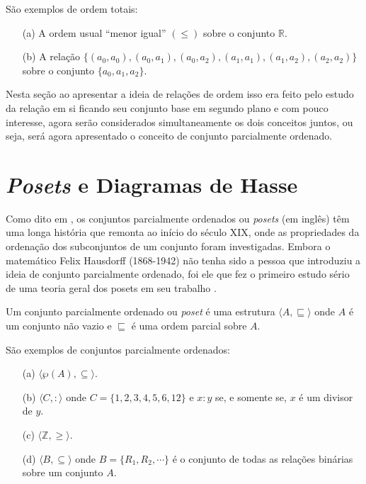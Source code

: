 \begin{exemplo}
	São exemplos de ordem totais:
	\begin{itemize}
		\item[(a)] A ordem usual ``menor igual'' $(\leq)$ sobre o conjunto $\mathbb{R}$.
		\item[(b)] A relação $\{(a_0, a_0), (a_0, a_1), (a_0, a_2), (a_1, a_1), (a_1, a_2), (a_2, a_2)\}$ sobre o conjunto $\{a_0, a_1, a_2\}$.
	\end{itemize}
\end{exemplo}

Nesta seção ao apresentar a ideia de relações de ordem isso era feito pelo estudo da relação em si ficando seu conjunto base em segundo plano e com pouco interesse, agora serão considerados simultaneamente os dois conceitos juntos, ou seja, será agora apresentado o conceito de conjunto parcialmente ordenado.

\section{\textit{Posets} e Diagramas de Hasse}\label{sec:Poset}

Como dito em \cite{neggers1998poset},  os conjuntos parcialmente ordenados ou \textit{posets} (em inglês) têm uma longa história que remonta ao início do século XIX, onde as propriedades da ordenação dos subconjuntos de um conjunto foram investigadas.  Embora o matemático Felix Hausdorff (1868-1942) não tenha sido a pessoa que introduziu a ideia de conjunto parcialmente ordenado, foi ele que fez o primeiro estudo sério de uma teoria geral dos posets em seu trabalho \cite{hausdorff1914poset}. 

\begin{definicao}[Poset]
	Um conjunto parcialmente ordenado ou \textit{poset} é uma estrutura $\langle A, \sqsubseteq \rangle$ onde $A$ é um conjunto não vazio e $\sqsubseteq$ é uma ordem parcial sobre $A$.
\end{definicao}

\begin{exemplo}
	São exemplos de conjuntos parcialmente ordenados:
	\begin{itemize}
		\item[(a)] $\langle \wp(A), \subseteq \rangle$.
		\item[(b)] $\langle C,  : \rangle$ onde $C = \{1, 2, 3, 4, 5, 6, 12\}$ e $x : y$ se, e somente se, $x$ é um divisor de $y$.
		\item[(c)] $\langle \mathbb{Z}, \geq \rangle$.
		\item[(d)] $\langle B, \subseteq \rangle$ onde $B = \{R_1, R_2, \cdots\}$ é o conjunto de todas as relações binárias sobre um conjunto $A$.
	\end{itemize}
\end{exemplo}

